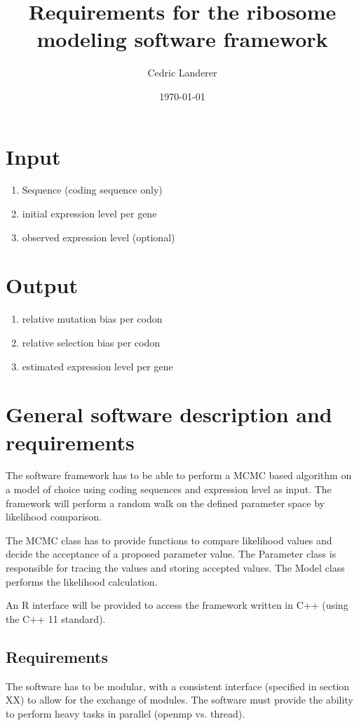 \documentclass[11pt]{article}
\begin{document}
  \title{Requirements for the ribosome modeling software framework}
  \author{Cedric Landerer} %
  \date{\today}
  \maketitle
 

  \section{Input}
  \begin{enumerate}
   \item Sequence (coding sequence only)
   \item initial expression level per gene
   \item observed expression level (optional)
  \end{enumerate}
  
  \section{Output}
  \begin{enumerate}
   \item relative mutation bias per codon
   \item relative selection bias per codon
   \item estimated expression level per gene
  \end{enumerate}
 
  \section{General software description and requirements}
  The software framework has to be able to perform a MCMC based algorithm on a model of choice using coding sequences and expression level as input.
  The framework will perform a random walk on the defined parameter space by likelihood comparison. 
  
  The MCMC class has to provide functions to compare likelihood values and decide the acceptance of a proposed parameter value.
  The Parameter class is responsible for tracing the values and storing accepted values.
  The Model class performs the likelihood calculation.
  
  
  An R interface will be provided to access the framework written in C++ (using the C++ 11 standard).
  
  \subsection{Requirements}
  The software has to be modular, with a consistent interface (specified in section XX) to allow for the exchange of modules.
  The software must provide the ability to perform heavy tasks in parallel (openmp vs. thread).
  
\end{document}
